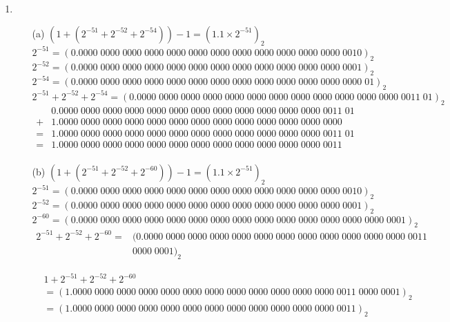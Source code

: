 \documentclass[UTF8]{ctexart}
\begin{document}
\begin{enumerate}
\item \begin{itemize}
\item[(a)] $(1 + (2^{-51} + 2^{-52} + 2^{-54})) - 1 = (1.1 \times 2^{-51})_2$ \\
$2^{-51} = (0.0000\;0000\;0000\;0000\;0000\;0000\;0000\;0000\;0000\;0000\;0000\;0000\;0010)_2$ \\
$2^{-52} = (0.0000\;0000\;0000\;0000\;0000\;0000\;0000\;0000\;0000\;0000\;0000\;0000\;0001)_2$ \\
$2^{-54} = (0.0000\;0000\;0000\;0000\;0000\;0000\;0000\;0000\;0000\;0000\;0000\;0000\;0000\;01)_2$ \\
$2^{-51} + 2^{-52} + 2^{-54} = (0.0000\;0000\;0000\;0000\;0000\;0000\;0000\;0000\;0000\;0000\;0000\;0000\;0011\;01)_2$
\begin{align*}
 &0.0000\;0000\;0000\;0000\;0000\;0000\;0000\;0000\;0000\;0000\;0000\;0000\;0011\;01 \\
+&1.0000\;0000\;0000\;0000\;0000\;0000\;0000\;0000\;0000\;0000\;0000\;0000\;0000 \\
\hline
=&1.0000\;0000\;0000\;0000\;0000\;0000\;0000\;0000\;0000\;0000\;0000\;0000\;0011\;01 \\
=&1.0000\;0000\;0000\;0000\;0000\;0000\;0000\;0000\;0000\;0000\;0000\;0000\;0011 \\
\end{align*}


\item[(b)] $(1 + (2^{-51} + 2^{-52} + 2^{-60})) - 1 = (1.1 \times 2^{-51})_2$ \\
$2^{-51} = (0.0000\;0000\;0000\;0000\;0000\;0000\;0000\;0000\;0000\;0000\;0000\;0000\;0010)_2$ \\
$2^{-52} = (0.0000\;0000\;0000\;0000\;0000\;0000\;0000\;0000\;0000\;0000\;0000\;0000\;0001)_2$ \\
$2^{-60} = (0.0000\;0000\;0000\;0000\;0000\;0000\;0000\;0000\;0000\;0000\;0000\;0000\;0000\;0000\;0001)_2$ \\
\begin{align*}
2^{-51} + 2^{-52} + 2^{-60} = &(0.0000\;0000\;0000\;0000\;0000\;0000\;0000\;0000\;0000\;0000\;0000\;0000\;0011 \\
                              &   0000\;0001)_2
\end{align*}

\begin{align*}
&1 + 2^{-51} + 2^{-52} + 2^{-60} \\
&=(1.0000\;0000\;0000\;0000\;0000\;0000\;0000\;0000\;0000\;0000\;0000\;0000\;0011\;0000\;0001)_2 \\
&=(1.0000\;0000\;0000\;0000\;0000\;0000\;0000\;0000\;0000\;0000\;0000\;0000\;0011)_2
\end{align*}


\end{itemize}
\end{enumerate}
\end{document}
